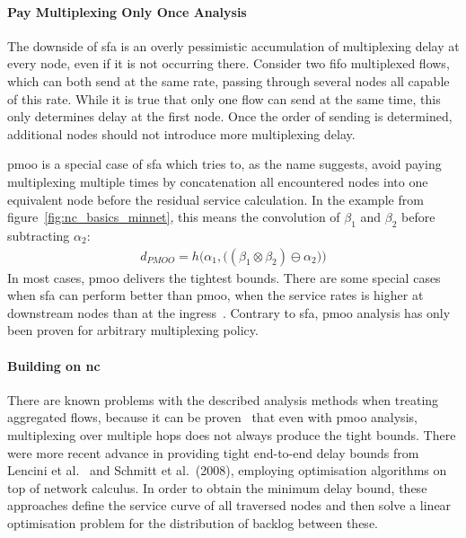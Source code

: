 \paragraph{Pay Multiplexing Only Once Analysis}
The downside of \gls{sfa} is an overly pessimistic accumulation of multiplexing delay at every node, even if it is not occurring there. Consider two \gls{fifo} multiplexed flows, which can both send at the same rate, passing through several nodes
all capable of this rate. While it is true that only one flow can send at the same time, this only determines delay at the first node. Once the order of sending is determined, additional nodes should not introduce more multiplexing delay.
\par
\gls{pmoo} is a special case of \gls{sfa} which tries to, as the name suggests, avoid paying multiplexing multiple times by concatenation all encountered nodes into one equivalent node before the residual service calculation.
In the example from figure~\ref{fig:nc_basics_minnet}, this means the convolution of $\beta_1$ and $\beta_2$ before subtracting $\alpha_2$:
%
\begin{align}
d_{PMOO} = h \Big( \alpha_1, \big( (\beta_1 \otimes \beta_2) \ominus \alpha_2 \big) \Big)
\label{eq:d_pmoo}
\end{align}
%
In most cases, \gls{pmoo} delivers the tightest bounds. There are some special cases when \gls{sfa} can perform better than \gls{pmoo}, when the service rates is higher at downstream nodes than at the ingress~\cite{schmitt_delay_2008}.
Contrary to \gls{sfa}, \gls{pmoo} analysis has only been proven for arbitrary multiplexing policy.

\paragraph{Building on \gls{nc}}
There are known problems with the described analysis methods when treating aggregated flows, because it can be proven~\cite{schmitt_delay_2008} that even with \gls{pmoo} analysis, multiplexing over multiple hops
does not always produce the tight bounds. There were more recent advance in providing tight end-to-end delay bounds from Lencini et al.~\cite{lenzini_end--end_2007} and Schmitt et al.~\cite{schmitt_delay_2008}(2008), employing optimisation algorithms on top of network calculus. In order to obtain the minimum delay bound, these approaches define the service curve of all traversed nodes and then solve a linear optimisation problem for the distribution of backlog between these. 

